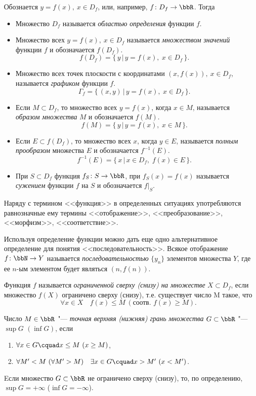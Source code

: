 Обознается $y=f(x),\ x\in D_f$, или, например, $f\colon D_f \to \bbR$. Тогда
\begin{itemize}[wide, labelwidth=!, labelindent=0pt]
\item
Множество $D_f$ называется \textit{областью определения} функции $f$.
\item
Множество всех $y=f(x),\ x\in D_f$ называется \textit{множеством значений} функции $f$ и обозначается $f(D_f)$. $$f(D_f)=\{\,y \,\big|\, y=f(x),\; x\in D_f\,\}.$$
\item 
Множество всех точек плоскости с координатами $(x, f(x)),\ x\in D_f$, называется \textit{графиком} функции $f$. $$\Gamma_f = \{\,(x,y) \,\big|\, y = f(x),\; x\in D_f\,\}.$$
\item
Если $M \subset D_f$, то множество всех $y=f(x)$, когда $x\in M$, называется \textit{образом множества} $M$ и обозначается $f(M)$. $$f(M) = \{\,y\,\big|\, y=f(x),\; x\in M\,\}.$$
\item
Если $E \subset f(D_f)$, то множество всех $x$, когда $y\in E$, называется \textit{полным прообразом} множества $E$ и обозначается $f^{-1}(E)$. $$f^{-1}(E)=\{\,x \,\big|\, x\in D_f,\; f(x)\in E\,\}.$$
\item
При $S\subset D_f$ функция $f_S\colon S\to\bbR$, при $f_S(x)=f(x)$ называется \textit{сужением} функции $f$ на $S$ и обозначается $f\bigr|_S$.
\end{itemize}
 
Наряду с термином <<функция>> в определенных ситуациях употребляются равнозначные ему термины <<отображение>>, <<преобразование>>, <<морфизм>>, <<соответствие>>.
\begin{notion}
Используя определение функции можно дать еще одно альтернативное определение для понятия <<последовательность>>. Всякое отображение $f\colon \bbN \to Y$  называется \textit{последовательностью} $\{y_n\}$ элементов множества $Y$, где ее $n$-ым элементом будет являться $(n,f(n))$.
\end{notion} 

\begin{defn}
Функция $f$ называется \textit{ограниченной сверху (снизу) на множестве} $X\subset D_f$, если множество $f(X)$ ограничено сверху (снизу), т.е. существует число M такое, что
$$
\forall x \in X \quad f(x) \le M \ (\text{соотв. } f(x)\ge M).
$$
\end{defn}

\begin{defn}
Число $M \in \bbR$ "--- \textit{точная верхняя (нижняя) грань множества} $G \subset \bbR$ "--- $\sup G$ $(\inf G)$, если 
\begin{enumerate}
\item
$\forall x \in G\cquad x \le M \ (x\ge M)$,
\item
$\forall M' < M \ (\forall M' > M)\quad \exists x\in G\cquad x>M' \ (x<M')$.
\end{enumerate}
\quad\textbullet\quad Eсли множество $G \subset \bbR$ не ограничено сверху (снизу), то, по определению, $\sup G=+\infty$ ($\inf G=-\infty$).  
\end{defn}

